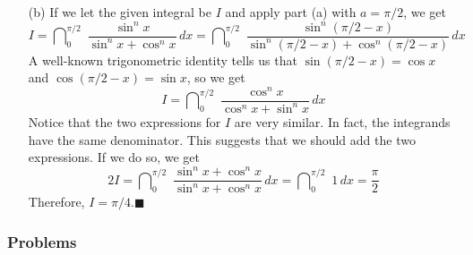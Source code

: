 \documentclass{sebase}
\begin{document}
\begin{Solution}
\begin{enumerate}
\item[(b)] 
If we let the given
integral be $I$ and apply part (a) with $a=\pi /2$, we get 
\begin{equation*}
I=\dint\nolimits_{0}^{\pi /2}\,\,\frac{\sin ^{n}x}{\sin ^{n}x+\cos ^{n}x}%
\,dx=\dint\nolimits_{0}^{\pi /2}\,\,\frac{\sin ^{n}(\pi /2-x)}{\sin ^{n}(\pi
/2-x)+\cos ^{n}(\pi /2-x)}\,dx
\end{equation*}
A well-known trigonometric identity tells us that $\sin (\pi /2-x)=\cos x$
and $\cos (\pi /2-x)=\sin x$, so we get 
\begin{equation*}
I=\dint\nolimits_{0}^{\pi /2}\,\,\frac{\cos ^{n}x}{\cos ^{n}x+\sin ^{n}x}\,dx
\end{equation*}
Notice that the two expressions for $I$ are very similar. In fact, the
integrands have the same denominator. This suggests that we should add the
two expressions. If we do so, we get 
\begin{equation*}
2I=\dint\nolimits_{0}^{\pi /2}\,\,\frac{\sin ^{n}x+\cos ^{n}x}{\sin
^{n}x+\cos ^{n}x}\,dx=\dint\nolimits_{0}^{\pi /2}\,\,1\,dx=\frac{\pi }{2}
\end{equation*}
Therefore, $I=\pi /4$.$\blacksquare $
\end{enumerate}
\end{Solution}

\subsubsection{Problems\protect\vspace*{-9pt}}
\end{document}
